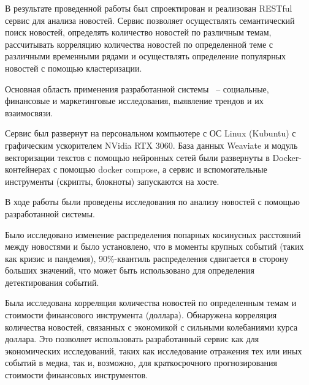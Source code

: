 
В результате проведенной работы был спроектирован и реализован RESTful сервис для анализа новостей. Сервис позволяет осуществлять семантический поиск новостей, определять количество новостей по различным темам, рассчитывать корреляцию количества новостей по определенной теме с различными временными рядами и осуществлять определение популярных новостей с помощью кластеризации.

Основная область применения разработанной системы ~-- социальные, финансовые и маркетинговые исследования, выявление трендов и их взаимосвязи.

Сервис был развернут на персональном компьютере с ОС Linux (Kubuntu) с графическим ускорителем NVidia RTX 3060. База данных Weaviate и модуль векторизации текстов с помощью нейронных сетей были развернуты в Docker-контейнерах с помощью docker compose, а сервис и вспомогательные инструменты (скрипты, блокноты) запускаются на хосте.

В ходе работы были проведены исследования по анализу новостей с помощью разработанной системы.

Было исследовано изменение распределения попарных косинусных расстояний между новостями и было установлено, что в моменты крупных событий (таких как кризис и пандемия), 90\%-квантиль распределения сдвигается в сторону больших значений, что может быть использовано для определения детектирования событий.

Была исследована корреляция количества новостей по определенным темам и стоимости финансового инструмента (доллара). Обнаружена корреляция количества новостей, связанных с экономикой с сильными колебаниями курса доллара. Это позволяет использовать разработанный сервис как для экономических исследований, таких как исследование отражения тех или иных событий в медиа, так и, возможно, для краткосрочного прогнозирования стоимости финансовых инструментов.

